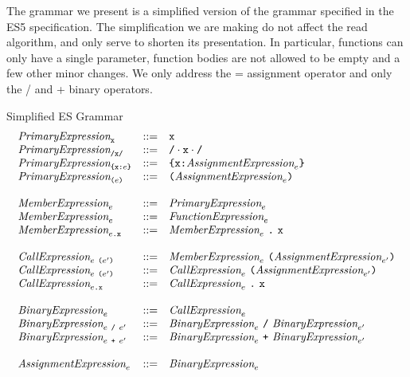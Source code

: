\documentclass[preprint,10pt]{sigplanconf}
\begin{document}
The grammar we present is a simplified version of the grammar
specified in the ES5 specification. The simplification we are making
do not affect the read algorithm, and only serve to shorten its
presentation. In particular, functions can only have a single
parameter, function bodies are not allowed to be empty and a few other
minor changes. We only address the = assignment operator and only the
/ and + binary operators.

\begin{displayfigure*}{\label{fig:grammar}Simplified ES Grammar}
\[
\begin{array}{lcl}
  \textit{PrimaryExpression}_{\texttt{x}} &::=& \texttt{x} 
  \\
  \textit{PrimaryExpression}_{\texttt{/x/}} &::=& \texttt{/} \cdot \texttt{x} \cdot \texttt{/} 
  \\
  \textit{PrimaryExpression}_{\texttt{\{}\texttt{x} \texttt{:} e\texttt{\}}} &::=& 
  \texttt{\{}\texttt{x} \texttt{:} \textit{AssignmentExpression}_{e}\texttt{\}}
  \\
  \textit{PrimaryExpression}_{\texttt{(}e\texttt{)}} &::=& 
  \texttt{(}\textit{AssignmentExpression}_{e}\texttt{)}
  \\ \\
  \textit{MemberExpression}_{e} &::=&
  \textit{PrimaryExpression}_{e}
  \\
  \textit{MemberExpression}_{e} &::=&
  \textit{FunctionExpression}_{e}
  \\
  \textit{MemberExpression}_{e\texttt{.\texttt{x}}} &::=&
  \textit{MemberExpression}_{e}~\texttt{.}~\texttt{x}
  \\ \\
  \textit{CallExpression}_{e~\texttt{(}e'\texttt{)}} &::=& 
  \textit{MemberExpression}_{e}~
  \texttt{(}\textit{AssignmentExpression}_{e'}\texttt{)}
  \\
  \textit{CallExpression}_{e~\texttt{(}e'\texttt{)}} &::=& 
  \textit{CallExpression}_{e}~
  \texttt{(}\textit{AssignmentExpression}_{e'}\texttt{)}
  \\
  \textit{CallExpression}_{e\texttt{.\texttt{x}}} &::=& 
  \textit{CallExpression}_{e}~\texttt{.}~
  \texttt{x}
  \\ \\
  \textit{BinaryExpression}_{e} &::=& \textit{CallExpression}_{e} \\
  \textit{BinaryExpression}_{e ~\texttt{/}~ e'}
  &::=&
  \textit{BinaryExpression}_{e} ~\texttt{/}~ \textit{BinaryExpression}_{e'} \\
  \textit{BinaryExpression}_{e ~\texttt{+}~ e'}
  &::=&
  \textit{BinaryExpression}_{e} ~\texttt{+}~ \textit{BinaryExpression}_{e'}
  \\ \\
  \textit{AssignmentExpression}_{e} &::=&
  \textit{BinaryExpression}_{e}

\end{array}\]
\end{displayfigure*}
\end{document}
